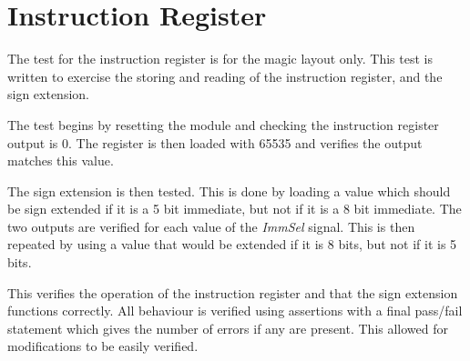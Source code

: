 
\section{Instruction Register}


The test for the instruction register is for the magic layout only.
This test is written to exercise the storing and reading of the instruction register, and the sign extension.

The test begins by resetting the module and checking the instruction register output is 0. 
The register is then loaded with 65535 and verifies the output matches this value.

The sign extension is then tested. 
This is done by loading a value which should be sign extended if it is a 5 bit immediate, but not if it is a 8 bit immediate. 
The two outputs are verified for each value of the \textit{ImmSel} signal. 
This is then repeated by using a value that would be extended if it is 8 bits, but not if it is 5 bits. 

This verifies the operation of the instruction register and that the sign extension functions correctly. 
All behaviour is verified using assertions with a final pass/fail statement which gives the number of errors if any are present. 
This allowed for modifications to be easily verified. 

